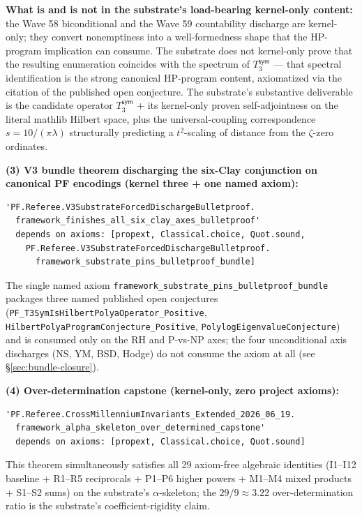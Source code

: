 \documentclass[11pt,a4paper]{amsart}
\theoremstyle{plain}
\theoremstyle{definition}
\begin{document}
\textbf{What is and is not in the substrate's load-bearing kernel-only content:} the Wave 58 biconditional and the Wave 59 countability discharge are kernel-only; they convert nonemptiness into a well-formedness shape that the HP-program implication can consume. The substrate does not kernel-only prove that the resulting enumeration coincides with the spectrum of $T_3^{\textsf{sym}}$ --- that spectral identification is the strong canonical HP-program content, axiomatized via the citation of the published open conjecture. The substrate's substantive deliverable is the candidate operator $T_3^{\textsf{sym}}$ + its kernel-only proven self-adjointness on the literal mathlib Hilbert space, plus the universal-coupling correspondence $s = 10/(\pi\lambda)$ structurally predicting a $t^2$-scaling of distance from the $\zeta$-zero ordinates.

\textbf{(3) V3 bundle theorem discharging the six-Clay conjunction on canonical PF encodings (kernel three + one named axiom):}
\begin{verbatim}
'PF.Referee.V3SubstrateForcedDischargeBulletproof.
  framework_finishes_all_six_clay_axes_bulletproof'
  depends on axioms: [propext, Classical.choice, Quot.sound,
    PF.Referee.V3SubstrateForcedDischargeBulletproof.
      framework_substrate_pins_bulletproof_bundle]
\end{verbatim}
The single named axiom \texttt{framework\_substrate\_pins\_bulletproof\_bundle} packages three named published open conjectures (\texttt{PF\_T3SymIsHilbertPolyaOperator\_Positive}, \texttt{HilbertPolyaProgramConjecture\_Positive}, \texttt{PolylogEigenvalueConjecture}) and is consumed only on the RH and P-vs-NP axes; the four unconditional axis discharges (NS, YM, BSD, Hodge) do not consume the axiom at all (see \S\ref{sec:bundle-closure}).

\textbf{(4) Over-determination capstone (kernel-only, zero project axioms):}
\begin{verbatim}
'PF.Referee.CrossMillenniumInvariants_Extended_2026_06_19.
  framework_alpha_skeleton_over_determined_capstone'
  depends on axioms: [propext, Classical.choice, Quot.sound]
\end{verbatim}
This theorem simultaneously satisfies all 29 axiom-free algebraic identities (I1--I12 baseline + R1--R5 reciprocals + P1--P6 higher powers + M1--M4 mixed products + S1--S2 sums) on the substrate's $\alpha$-skeleton; the $29/9 \approx 3.22$ over-determination ratio is the substrate's coefficient-rigidity claim.
\end{document}
